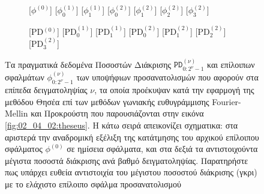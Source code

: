 \begin{figure}
  \begin{subfigure}{0.5\linewidth}
    \begin{onion}{1.0cm}
      [$\phi^{(0)}$]
      [$\phi_0^{(1)}$]
      [$\phi_1^{(1)}$]
      [$\phi_0^{(2)}$]
      [$\phi_1^{(2)}$]
      [$\phi_2^{(2)}$]
      [$\phi_3^{(2)}$]
    \end{onion}
  \end{subfigure}%
  \begin{subfigure}{0.5\linewidth}\vspace{-0.1cm}
    \begin{onion}{1.0cm}
      [PD$^{(0)}$]
      [PD$_0^{(1)}$]
      [PD$_1^{(1)}$]
      [PD$_0^{(2)}$]
      [PD$_1^{(2)}$]
      [PD$_2^{(2)}$]
      [PD$_3^{(2)}$]
    \end{onion}
  \end{subfigure}
\vspace{-1cm}
\caption{\small Τα πραγματικά δεδομένα Ποσοστών Διάκρισης
         $\texttt{PD}^{(\nu)}_{0:2^{\nu}-1}$ και επίλοιπων σφαλμάτων
         $\phi^{(\nu)}_{0:2^{\nu}-1}$ των υποψήφιων προσανατολισμών που αφορούν
         στα επίπεδα δειγματοληψίας $\nu$, τα οποία προέκυψαν κατά την εφαρμογή
         της μεθόδου Θησέα επί των μεθόδων γωνιακής ευθυγράμμισης
         Fourier-Mellin και Προκρούστη που παρουσιάζονται στην εικόνα
         \ref{fig:02_04_02:theseus}. Η κάτω σειρά απεικονίζει σχηματικα: στα
         αριστερά την αναδρομική εξέλιξη της κατάτμησης του αρχικού επίλοιπου
         σφάλματος $\phi^{(0)}$ σε ημίσεια σφάλματα, και στα δεξιά τα
         αντιστοιχούντα μέγιστα ποσοστά διάκρισης ανά βαθμό δειγματοληψίας.
         Παρατηρήστε πως υπάρχει ευθεία αντιστοιχία του μέγιστου ποσοστού
         διάκρισης (γκρι) με το ελάχιστο επίλοιπο σφάλμα προσανατολισμού}
\label{fig:02_04_02:theseus_pd}
\end{figure}

